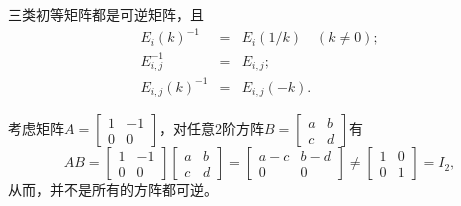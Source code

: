 
\begin{eg}
三类初等矩阵都是可逆矩阵，且
\begin{eqnarray*}
E_i(k)^{-1} & = & E_i(1/k) \quad (k\neq 0); \\
E_{i,j}^{-1} & = & E_{i,j}; \\
E_{i,j}(k)^{-1} & = & E_{i,j}(-k).
\end{eqnarray*}
\end{eg}

\begin{eg}
考虑矩阵$A = \begin{bmatrix} 1 & -1 \\ 0 & 0 \end{bmatrix}$，对任意$2$阶方阵$B= \begin{bmatrix} a & b \\ c & d \end{bmatrix}$有
$$AB = \begin{bmatrix} 1 & -1 \\ 0 & 0 \end{bmatrix} \begin{bmatrix} a & b \\ c & d \end{bmatrix} = \begin{bmatrix} a-c & b-d \\ 0 & 0 \end{bmatrix} \neq \begin{bmatrix} 1 & 0 \\ 0 & 1 \end{bmatrix} = I_2,$$
从而，并不是所有的方阵都可逆。
\end{eg}

